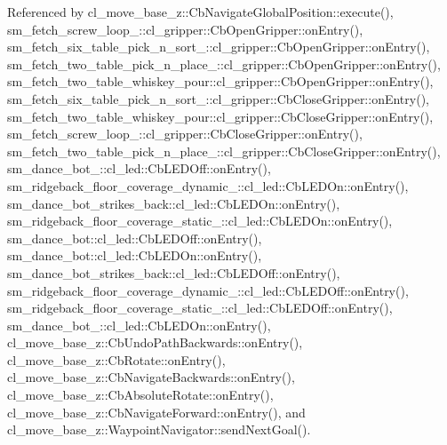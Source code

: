 Referenced by cl\+\_\+move\+\_\+base\+\_\+z\+::\+Cb\+Navigate\+Global\+Position\+::execute(), sm\+\_\+fetch\+\_\+screw\+\_\+loop\+\_\+::cl\+\_\+gripper\+::\+Cb\+Open\+Gripper\+::on\+Entry(), sm\+\_\+fetch\+\_\+six\+\_\+table\+\_\+pick\+\_\+n\+\_\+sort\+\_\+::cl\+\_\+gripper\+::\+Cb\+Open\+Gripper\+::on\+Entry(), sm\+\_\+fetch\+\_\+two\+\_\+table\+\_\+pick\+\_\+n\+\_\+place\+\_\+::cl\+\_\+gripper\+::\+Cb\+Open\+Gripper\+::on\+Entry(), sm\+\_\+fetch\+\_\+two\+\_\+table\+\_\+whiskey\+\_\+pour\+::cl\+\_\+gripper\+::\+Cb\+Open\+Gripper\+::on\+Entry(), sm\+\_\+fetch\+\_\+six\+\_\+table\+\_\+pick\+\_\+n\+\_\+sort\+\_\+::cl\+\_\+gripper\+::\+Cb\+Close\+Gripper\+::on\+Entry(), sm\+\_\+fetch\+\_\+two\+\_\+table\+\_\+whiskey\+\_\+pour\+::cl\+\_\+gripper\+::\+Cb\+Close\+Gripper\+::on\+Entry(), sm\+\_\+fetch\+\_\+screw\+\_\+loop\+\_\+::cl\+\_\+gripper\+::\+Cb\+Close\+Gripper\+::on\+Entry(), sm\+\_\+fetch\+\_\+two\+\_\+table\+\_\+pick\+\_\+n\+\_\+place\+\_\+::cl\+\_\+gripper\+::\+Cb\+Close\+Gripper\+::on\+Entry(), sm\+\_\+dance\+\_\+bot\+\_\+::cl\+\_\+led\+::\+Cb\+L\+E\+D\+Off\+::on\+Entry(), sm\+\_\+ridgeback\+\_\+floor\+\_\+coverage\+\_\+dynamic\+\_\+::cl\+\_\+led\+::\+Cb\+L\+E\+D\+On\+::on\+Entry(), sm\+\_\+dance\+\_\+bot\+\_\+strikes\+\_\+back\+::cl\+\_\+led\+::\+Cb\+L\+E\+D\+On\+::on\+Entry(), sm\+\_\+ridgeback\+\_\+floor\+\_\+coverage\+\_\+static\+\_\+::cl\+\_\+led\+::\+Cb\+L\+E\+D\+On\+::on\+Entry(), sm\+\_\+dance\+\_\+bot\+::cl\+\_\+led\+::\+Cb\+L\+E\+D\+Off\+::on\+Entry(), sm\+\_\+dance\+\_\+bot\+::cl\+\_\+led\+::\+Cb\+L\+E\+D\+On\+::on\+Entry(), sm\+\_\+dance\+\_\+bot\+\_\+strikes\+\_\+back\+::cl\+\_\+led\+::\+Cb\+L\+E\+D\+Off\+::on\+Entry(), sm\+\_\+ridgeback\+\_\+floor\+\_\+coverage\+\_\+dynamic\+\_\+::cl\+\_\+led\+::\+Cb\+L\+E\+D\+Off\+::on\+Entry(), sm\+\_\+ridgeback\+\_\+floor\+\_\+coverage\+\_\+static\+\_\+::cl\+\_\+led\+::\+Cb\+L\+E\+D\+Off\+::on\+Entry(), sm\+\_\+dance\+\_\+bot\+\_\+::cl\+\_\+led\+::\+Cb\+L\+E\+D\+On\+::on\+Entry(), cl\+\_\+move\+\_\+base\+\_\+z\+::\+Cb\+Undo\+Path\+Backwards\+::on\+Entry(), cl\+\_\+move\+\_\+base\+\_\+z\+::\+Cb\+Rotate\+::on\+Entry(), cl\+\_\+move\+\_\+base\+\_\+z\+::\+Cb\+Navigate\+Backwards\+::on\+Entry(), cl\+\_\+move\+\_\+base\+\_\+z\+::\+Cb\+Absolute\+Rotate\+::on\+Entry(), cl\+\_\+move\+\_\+base\+\_\+z\+::\+Cb\+Navigate\+Forward\+::on\+Entry(), and cl\+\_\+move\+\_\+base\+\_\+z\+::\+Waypoint\+Navigator\+::send\+Next\+Goal().



